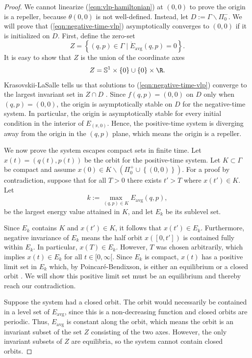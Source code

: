 \begin{proof}
   We cannot linearize (\ref{eqn:vlp-hamiltonian}) at \((0,0)\) to prove 
   the origin is a repeller, because \(\theta(0,0)\) is not well-defined. 
   Instead, let \(D := \Gamma \backslash \Pi_0^-\).
   We will prove that (\ref{eqn:negative-time-vlp}) asymptotically converges to
   \((0,0)\) if it is initialized on \(D\).
   First, define the zero-set
   \[
      Z = \left\{(q,p) \in \Gamma \mid 
      \dot{E}_\text{avg}(q,p) = 0 \right\}
      .
   \]
   It is easy to show that \(Z\) is the union of the coordinate axes
   \[
      Z= \mathbb{S}^1 \times \left\{0\right\} \cup 
         \left\{0\right\} \times \R
      .
   \]
   Krasovskii-LaSalle tells us that solutions to (\ref{eqn:negative-time-vlp})
   converge to the largest invariant set in \(Z \cap D\)
   \cite{krasovskii_lasalle}.
   Since \(f(q,p) = (0,0)\) on \(D\) only when \((q,p) = (0,0)\),
   the origin is asymptotically stable on \(D\) for the negative-time system.
   In particular, the origin is asymptotically stable for every initial
   condition in the interior of \(E_{(\pi,0)}\).
   Hence, the positive-time system is diverging away from the origin 
   in the \((q,p)\) plane, which means the origin is a repeller.

   We now prove the system escapes compact sets in finite time.
   Let \(x(t) = (q(t),p(t))\) be the orbit for the positive-time system.
   Let \(K \subset \Gamma\) be compact and assume 
   \(x(0) \in K\backslash \left(\Pi_0^+ \cup \left\{(0,0)\right\}\right)\).
   For a proof by contradiction, suppose that for all \(T > 0\) there exists
   \(t' > T\) where \(x(t') \in K\).
   Let 
   \[
      k := \max\limits_{(q,p) \in K} E_\text{avg}(q,p)
      ,
   \] 
   be the largest energy value attained in \(K\), and let \(E_k\) be its
   sublevel set.

   Since \(E_k\) contains \(K\) and \(x(t') \in K\), it follows that 
   \(x(t') \in E_k\). 
   Furthermore, negative invariance of \(E_k\) means the half orbit
   \(x([0,t'])\) is contained fully within \(E_k\).
   In particular, \(x(T) \in E_k\).
   However, \(T\) was chosen arbitrarily, which implies \(x(t) \in E_k\) for all
   \(t \in [0,\infty[\).
   Since \(E_k\) is compact, \(x(t)\) has a positive limit set in
   \(E_k\) which, by Poincar\'{e}-Bendixson, is either an equilibrium or a
   closed orbit \cite{poincare_bendixson}.
   We will show this positive limit set must be an equilibrium and thereby
   reach our contradiction.

   Suppose the system had a closed orbit. 
   The orbit would necessarily be contained in a
   level set of \(E_\text{avg}\), since this is a non-decreasing function and
   closed orbits are periodic.
   Thus, \(E_\text{avg}\) is constant along the orbit, which means the
   orbit is an invariant subset of the set \(Z\) consisting of the two axes.
   However, the only invariant subsets of \(Z\) are equilibria, so 
   the system cannot contain closed orbits.


\end{proof}
